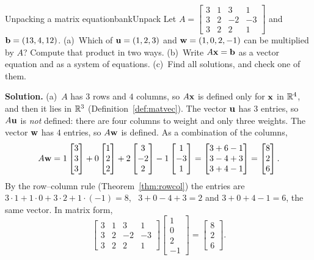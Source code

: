 \documentclass[11pt]{article}
\begin{document}
\begin{exmp}{Unpacking a matrix equation}{bankUnpack}
Let $A=\begin{bmatrix}3&1&3&1\\3&2&-2&-3\\3&2&2&1\end{bmatrix}$ and $\mathbf{b}=(13,4,12)$. (a)~Which of $\mathbf{u}=(1,2,3)$ and $\mathbf{w}=(1,0,2,-1)$ can be multiplied by $A$? Compute that product in two ways. (b)~Write $A\mathbf{x}=\mathbf{b}$ as a vector equation and as a system of equations. (c)~Find all solutions, and check one of them.

\textbf{Solution.} (a)~$A$ has $3$ rows and $4$ columns, so $A\mathbf{x}$ is defined only for $\mathbf{x}$ in $\mathbb{R}^4$, and then it lies in $\mathbb{R}^3$ (Definition~\ref{def:matvec}). The vector $\mathbf{u}$ has $3$ entries, so $A\mathbf{u}$ is \emph{not} defined: there are four columns to weight and only three weights. The vector $\mathbf{w}$ has $4$ entries, so $A\mathbf{w}$ is defined. As a combination of the columns,
\[
A\mathbf{w}=1\begin{bmatrix}3\\3\\3\end{bmatrix}+0\begin{bmatrix}1\\2\\2\end{bmatrix}+2\begin{bmatrix}3\\-2\\2\end{bmatrix}-1\begin{bmatrix}1\\-3\\1\end{bmatrix}
=\begin{bmatrix}3+6-1\\3-4+3\\3+4-1\end{bmatrix}=\begin{bmatrix}8\\2\\6\end{bmatrix}.
\]
By the row--column rule (Theorem~\ref{thm:rowcol}) the entries are $3\cdot1+1\cdot0+3\cdot2+1\cdot(-1)=8$, \ $3+0-4+3=2$ and $3+0+4-1=6$, the same vector. In matrix form,
\[
\begin{bmatrix}3&1&3&1\\3&2&-2&-3\\3&2&2&1\end{bmatrix}\begin{bmatrix}1\\0\\2\\-1\end{bmatrix}=\begin{bmatrix}8\\2\\6\end{bmatrix}.
\]


\end{exmp}
\end{document}
